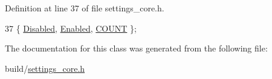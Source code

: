 Definition at line 37 of file settings\+\_\+core.\+h.


\begin{DoxyCode}
37 \{ \hyperlink{classOkular_1_1SettingsCore_1_1EnumTextHinting_a8b32766d39fec9699e5133223463450fa7e7c27a245665e157178bd7a2ad96743}{Disabled}, \hyperlink{classOkular_1_1SettingsCore_1_1EnumTextHinting_a8b32766d39fec9699e5133223463450fa86087d31ce91c09a308b4fc59be2e05a}{Enabled}, \hyperlink{classOkular_1_1SettingsCore_1_1EnumTextHinting_a8b32766d39fec9699e5133223463450fa2f4829ddd28a53d205c19b3e968620dc}{COUNT} \};
\end{DoxyCode}


The documentation for this class was generated from the following file\+:\begin{DoxyCompactItemize}
\item 
build/\hyperlink{settings__core_8h}{settings\+\_\+core.\+h}\end{DoxyCompactItemize}
